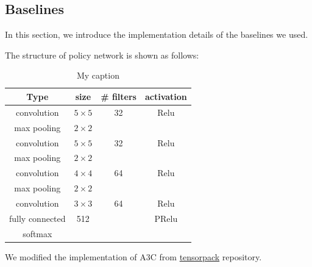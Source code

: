 \subsection{Baselines}

In this section, we introduce the implementation details of the baselines we used.

The structure of policy network is shown as follows:

\begin{table}[!ht]
	\centering
	\caption{My caption}
	\label{my-label}
	\begin{tabular}{c|c|c|c}
		\textbf{Type} & \textbf{size} & \textbf{\# filters} & \textbf{activation} \\ \hline
		convolution & $5\times5$ & 32 & Relu \\ 
		max pooling & $2\times2$ &  &  \\
		convolution & $5\times5$ & 32 & Relu \\
		max pooling & $2\times2$ &  &  \\
		convolution & $4\times4$ & 64 & Relu \\
		max pooling & $2\times2$ &  &  \\
		convolution & $3\times3$ & 64 & Relu \\
		fully connected & 512 &  & PRelu \\
		softmax &  &  & 
	\end{tabular}
\end{table}
We modified the implementation of A3C from \href{https://github.com/ppwwyyxx/tensorpack}{tensorpack} repository.


